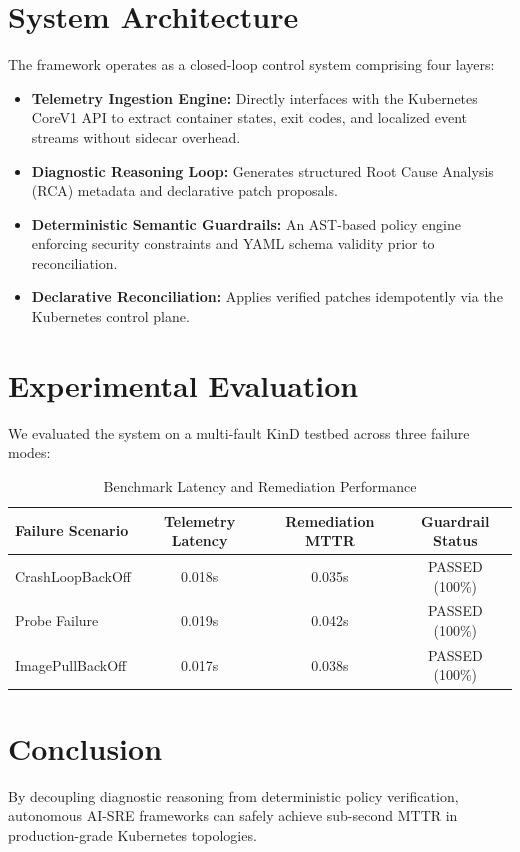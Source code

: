 \documentclass[conference]{IEEEtran}
\begin{document}
\section{System Architecture}
The framework operates as a closed-loop control system comprising four layers:
\begin{itemize}
    \item \textbf{Telemetry Ingestion Engine:} Directly interfaces with the Kubernetes CoreV1 API to extract container states, exit codes, and localized event streams without sidecar overhead.
    \item \textbf{Diagnostic Reasoning Loop:} Generates structured Root Cause Analysis (RCA) metadata and declarative patch proposals.
    \item \textbf{Deterministic Semantic Guardrails:} An AST-based policy engine enforcing security constraints and YAML schema validity prior to reconciliation.
    \item \textbf{Declarative Reconciliation:} Applies verified patches idempotently via the Kubernetes control plane.
\end{itemize}

\section{Experimental Evaluation}
We evaluated the system on a multi-fault KinD testbed across three failure modes:
\begin{table}[htbp]
\caption{Benchmark Latency and Remediation Performance}
\begin{center}
\begin{tabular}{@{}lccc@{}}
\toprule
\textbf{Failure Scenario} & \textbf{Telemetry Latency} & \textbf{Remediation MTTR} & \textbf{Guardrail Status} \\ \midrule
CrashLoopBackOff          & 0.018s                     & 0.035s                    & PASSED (100\%)            \\
Probe Failure             & 0.019s                     & 0.042s                    & PASSED (100\%)            \\
ImagePullBackOff          & 0.017s                     & 0.038s                    & PASSED (100\%)            \\ \bottomrule
\end{tabular}
\end{center}
\end{table}

\section{Conclusion}
By decoupling diagnostic reasoning from deterministic policy verification, autonomous AI-SRE frameworks can safely achieve sub-second MTTR in production-grade Kubernetes topologies.
\end{document}
